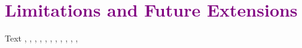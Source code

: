 \section{\textcolor{purple}{Limitations and Future Extensions}}

\color{purple}

Text
\cite{edelsbrunner1994}, \cite{coeurjolly2021}, \cite{fleishman2005}, \cite{brochu2010}, \cite{berge2019}, \cite{dey2003}, \cite{amenta2000}, \cite{dey2011}, \cite{boltcheva2017}, \cite{boltcheva2009}, \cite{kazhdan_2008}, \cite{kazhdan_2013}







\color{black}